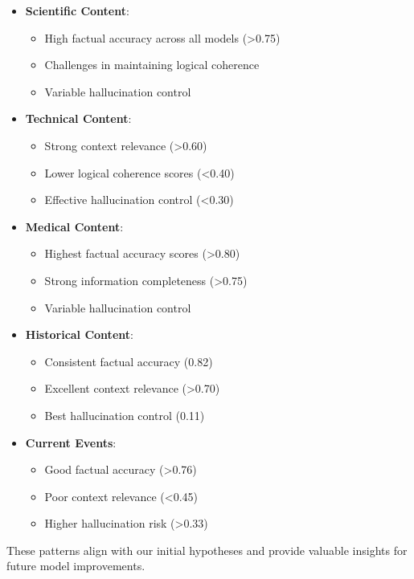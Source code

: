 \begin{itemize}
    \item \textbf{Scientific Content}:
    \begin{itemize}
        \item High factual accuracy across all models (>0.75)
        \item Challenges in maintaining logical coherence
        \item Variable hallucination control
    \end{itemize}
    
    \item \textbf{Technical Content}:
    \begin{itemize}
        \item Strong context relevance (>0.60)
        \item Lower logical coherence scores (<0.40)
        \item Effective hallucination control (<0.30)
    \end{itemize}
    
    \item \textbf{Medical Content}:
    \begin{itemize}
        \item Highest factual accuracy scores (>0.80)
        \item Strong information completeness (>0.75)
        \item Variable hallucination control
    \end{itemize}

    \item \textbf{Historical Content}:
    \begin{itemize}
        \item Consistent factual accuracy (0.82)
        \item Excellent context relevance (>0.70)
        \item Best hallucination control (0.11)
    \end{itemize}

    \item \textbf{Current Events}:
    \begin{itemize}
        \item Good factual accuracy (>0.76)
        \item Poor context relevance (<0.45)
        \item Higher hallucination risk (>0.33)
    \end{itemize}
\end{itemize}

These patterns align with our initial hypotheses and provide valuable insights for future model improvements.